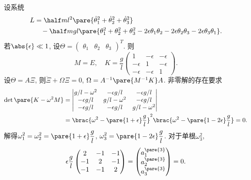\documentclass[../LectureNotes.tex]{subfiles}
\begin{document}
\begin{sample}
    \begin{ex}
        设系统
        \begin{align*}
            L &= \half ml^2 \pare{\dot{\theta}_1^2 + \dot{\theta}_2^2 + \dot{\theta}_3^2} \\ &\phantom{=}\, - \half mgl \pare{\theta_1^2 + \theta_2^2 + \theta_3^2 - 2\epsilon \theta_1\theta_2 - 2\epsilon \theta_2\theta_3 - 2\epsilon \theta_3\theta_1}.
        \end{align*}
        若$\abs{\epsilon} \ll 1$, 设$\Theta = \begin{pmatrix}
            \theta_1 & \theta_2 & \theta_3
        \end{pmatrix}^T$. 则
        \[ M = E,\quad K = \frac{g}{l} \begin{pmatrix}
            1 & -\epsilon & -\epsilon \\
            -\epsilon & 1 & -\epsilon \\
            -\epsilon & -\epsilon & 1
        \end{pmatrix}. \]
        设$\Theta = A\Xi$, 则$\ddot{\Xi} + \Omega\Xi = 0$, $\Omega = A^{-1}\pare{M^{-1}K}A$. 非零解的存在要求
        \begin{align*}
            \det\pare{K-\omega^2 M} &= \begin{vmatrix}
            g/l - \omega^2 & -\epsilon g/l & -\epsilon g/l \\
            -\epsilon g/l & g/l - \omega^2 & -\epsilon g/l \\
            -\epsilon g/l & -\epsilon g/l & g/l - \omega^2
        \end{vmatrix}\\ &= \brac{\omega^2 - \pare{1+\epsilon}\frac{g}{l}}^2 \brac{\omega^2 - \pare{1-2\epsilon}\frac{g}{l}} = 0.
        \end{align*}
        解得$\displaystyle \omega_1^2 = \omega_2^2 = \pare{1+\epsilon} \frac{g}{l}$, $\displaystyle \omega_3^2 = \pare{1-2\epsilon} \frac{g}{l}$. 对于单根$\omega_3^2$,
        \[ \epsilon \frac{g}{l} \begin{pmatrix}
            2 & -1 & -1 \\
            -1 & 2 & -1 \\
            -1 & -1 & 2
        \end{pmatrix} = \begin{pmatrix}
            a_1^{\pare{3}} \\ a_2^{\pare{3}} \\ a_3^{\pare{3}}
        \end{pmatrix} = 0. \]

\end{ex}
\end{sample}
\end{document}
